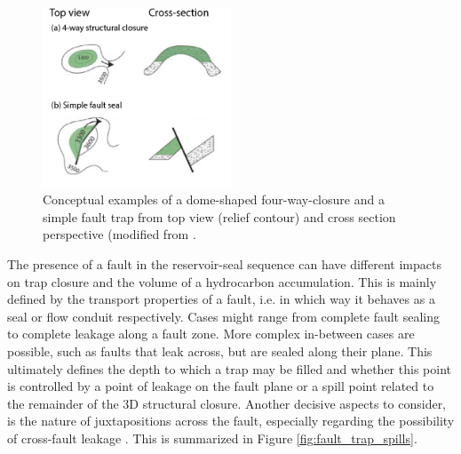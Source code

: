         \begin{figure}[h]
        	\centering
        	\includegraphics[width=0.5\textwidth]{Figures/trap_closure1}
        	\caption{Conceptual examples of a dome-shaped four-way-closure and a simple fault trap from top view (relief contour) and cross section perspective (modified from \citet{dolson2016basics}.}\label{fig:trap_types}
        \end{figure}        
        The presence of a fault in the reservoir-seal sequence can have different impacts on trap closure and the volume of a hydrocarbon accumulation. This is mainly defined by the transport properties of a fault, i.e. in which way it behaves as a seal or flow conduit respectively. Cases might range from complete fault sealing to complete leakage along a fault zone. More complex in-between cases are possible, such as faults that leak across, but are sealed along their plane. This ultimately defines the depth to which a trap may be filled and whether this point is controlled by a point of leakage on the fault plane or a spill point related to the remainder of the 3D structural closure. Another decisive aspects to consider, is the nature of juxtapositions across the fault, especially regarding the possibility of cross-fault leakage \citep{van2003lateral}. This is summarized in Figure \ref{fig:fault_trap_spills}.
